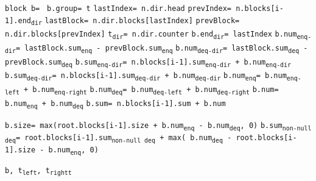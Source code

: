 \documentclass[10pt]{article}
\newcommand\keywordfont{\sffamily\bfseries}
\theoremstyle{definition}
\begin{document}
\begin{algorithm}
\begin{algorithmic}[1]
\begin{multicols}{2}
\Statex{}
\State \texttt{block b= }
\State \texttt{b.group= t}
\ForEach{\texttt{dir} {\keywordfont{in}} \texttt{\{left, right\}}}
\State \texttt{lastIndex= n.dir.head} \label{lastLine}
\State \texttt{prevIndex= n.blocks[i-1].end\textsubscript{dir}} \label{prevLine}
\State \texttt{lastBlock= n.dir.blocks[lastIndex]}
\State \texttt{prevBlock= n.dir.blocks[prevIndex]}
\State \texttt{t\textsubscript{dir}= n.dir.counter}
\State \texttt{b.end\textsubscript{dir}= lastIndex}
\State \texttt{b.num\textsubscript{enq-dir}= lastBlock.sum\textsubscript{enq} - prevBlock.sum\textsubscript{enq}}
\State \texttt{b.num\textsubscript{deq-dir}= lastBlock.sum\textsubscript{deq} - prevBlock.sum\textsubscript{deq}}
\State \texttt{b.sum\textsubscript{enq-dir}= n.blocks[i-1].sum\textsubscript{enq-dir} + b.num\textsubscript{enq-dir}}
\State \texttt{b.sum\textsubscript{deq-dir}= n.blocks[i-1].sum\textsubscript{deq-dir} + b.num\textsubscript{deq-dir}}
\EndFor
\State \texttt{b.num\textsubscript{enq}= b.num\textsubscript{enq-left} + b.num\textsubscript{enq-right}}
\State \texttt{b.num\textsubscript{deq}= b.num\textsubscript{deq-left} + b.num\textsubscript{deq-right}}
\State \texttt{b.num= b.num\textsubscript{enq} + b.num\textsubscript{deq}}
\State \texttt{b.sum= n.blocks[i-1].sum + b.num}

\State \texttt{b.size= max(root.blocks[i-1].size + b.num\textsubscript{enq} - b.num\textsubscript{deq}, 0)}
\State \texttt{b.sum\textsubscript{non-null deq}= root.blocks[i-1].sum\textsubscript{non-null deq} + max( b.num\textsubscript{deq} - root.blocks[i-1].size - b.num\textsubscript{enq}, 0)}
\EndIf

\State \Return \texttt{b, t\textsubscript{left}, t\textsubscript{rightt}}

\end{multicols}
\end{algorithmic}
\end{algorithm}
\end{document}
